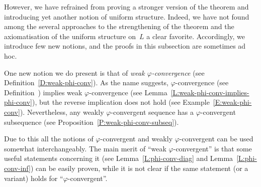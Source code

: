 \documentclass[main.tex]{subfiles}
\begin{document}
However, we have refrained from proving a stronger version of the theorem
and introducing yet another notion of uniform structure.
Indeed,
we have not found among the several approaches to the strengthening
of the theorem and the axiomatisation of the uniform structure on~$L$
a clear favorite.
Accordingly,
we introduce few new notions,
and the proofs in this subsection are sometimes ad hoc.

One new notion we do present is that of
\emph{weak $\varphi$-convergence}
(see Definition~\ref{D:weak-phi-conv}).
As the name suggests,
$\varphi$-convergence (see Definition~)
implies weak $\varphi$-convergence
(see Lemma~\ref{L:weak-phi-conv-implies-phi-conv}),
but the reverse implication does not hold
(see Example~\ref{E:weak-phi-conv}).
Nevertheless,
any weakly $\varphi$-convergent sequence
has a $\varphi$-convergent subsequence
(see Proposition~\ref{P:weak-phi-conv-subseq}).

Due to this all 
the notions of $\varphi$-convergent
and weakly $\varphi$-convergent
can be used somewhat interchangeably.
The main merit of ``weak $\varphi$-convergent''
is that some useful statements concerning it
(see Lemma~\ref{L:phi-conv-diag} and  Lemma~\ref{L:phi-conv-inf}) 
can be easily proven,
while it is not clear if the same statement (or a variant) holds for
``$\varphi$-convergent''.
\end{document}

